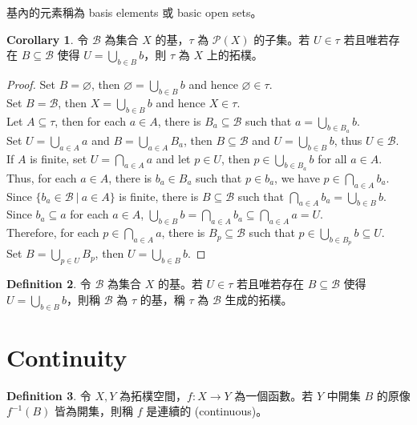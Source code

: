 \documentclass[12pt]{article}
\theoremstyle{definition}
\newtheorem{definition}{Definition}[section]
\newtheorem{corollary}[definition]{Corollary}
\newcommand\<{\langle}
\renewcommand\>{\rangle}
\begin{document}
\begin{CJK}{UTF8}{bsmi}
基內的元素稱為 basis elements 或 basic open sets。

\begin{corollary}
    令 $\mathcal{B}$ 為集合 $X$ 的基，$\tau$ 為 $\mathcal{P}(X)$ 的子集。若 $U\in\tau$ 若且唯若存在 $B\subseteq\mathcal{B}$ 使得 $U=\bigcup_{b\in B}b$，則 $\tau$ 為 $X$ 上的拓樸。
\end{corollary}
\begin{proof}
    Set $B=\varnothing$, then $\varnothing=\bigcup_{b\in B}b$ and hence $\varnothing\in\tau$. \\
    Set $B=\mathcal{B}$, then $X=\bigcup_{b\in B}b$ and hence $X\in\tau$. \\
    Let $A\subseteq\tau$, then for each $a\in A$, there is $B_a\subseteq\mathcal{B}$ such that $a=\bigcup_{b\in B_a}b$. \\
    Set $U=\bigcup_{a\in A}a$ and $B=\bigcup_{a\in A}B_a$, then $B\subseteq\mathcal{B}$ and $U=\bigcup_{b\in B}b$, thus $U\in\mathcal{B}$. \\
    If $A$ is finite, set $U=\bigcap_{a\in A}a$ and let $p\in U$, then $p\in\bigcup_{b\in B_a}b$ for all $a\in A$. \\
    Thus, for each $a\in A$, there is $b_a\in B_a$ such that $p\in b_a$, we have $p\in\bigcap_{a\in A}b_a$. \\
    Since $\{b_a\in\mathcal{B}\ |\ a\in A\}$ is finite, there is $B\subseteq\mathcal{B}$ such that $\bigcap_{a\in A}b_a=\bigcup_{b\in B}b$. \\
    Since $b_a\subseteq a$ for each $a\in A$, $\bigcup_{b\in B}b=\bigcap_{a\in A}b_a\subseteq\bigcap_{a\in A}a=U$. \\
    Therefore, for each $p\in\bigcap_{a\in A}a$, there is $B_p\subseteq\mathcal{B}$ such that $p\in\bigcup_{b\in B_p}b\subseteq U$. \\
    Set $B=\bigcup_{p\in U}B_p$, then $U=\bigcup_{b\in B}b$.
\end{proof}

\begin{definition}
    令 $\mathcal{B}$ 為集合 $X$ 的基。若 $U\in\tau$ 若且唯若存在 $B\subseteq\mathcal{B}$ 使得 $U=\bigcup_{b\in B}b$，則稱 $\mathcal{B}$ 為 $\tau$ 的基，稱 $\tau$ 為 $\mathcal{B}$ 生成的拓樸。
\end{definition}

\section{Continuity}

\begin{definition}
    令 $X, Y$ 為拓樸空間，$f:X\to Y$ 為一個函數。若 $Y$ 中開集 $B$ 的原像 $f^{-1}(B)$ 皆為開集，則稱 $f$ 是連續的 (continuous)。
\end{definition}


\end{CJK}
\end{document}
